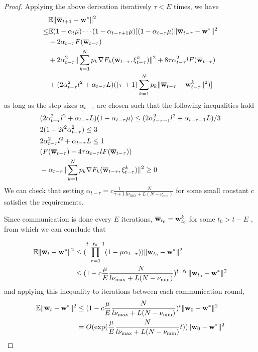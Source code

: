 \begin{proof}
	Applying the above derivation iteratively $\tau<E$ times, we have
	\begin{align*}
	& \mathbb{E}\|{\overline{\mathbf{w}}}_{t+1}-{\mathbf{w}}^{\ast}\|^{2}\\
	\leq &\mathbb{E}(1-\alpha_{t}\mu)\cdots(1-\alpha_{t-\tau+1}\mu)[(1-\alpha_{t-\tau}\mu)\|{\overline{\mathbf{w}}}_{t-\tau}-{\mathbf{w}}^{\ast}\|^{2}\\
	& -2\alpha_{t-\tau}F({\overline{\mathbf{w}}}_{t-\tau})\\
	&+2\alpha_{t-\tau}^{2}\|\sum_{k=1}^{N}p_{k}\nabla F_{k}({\overline{\mathbf{w}}}_{t-\tau},\xi_{t-\tau}^{k})\|^{2}+8\tau\alpha_{t-\tau}^{2}lF({\overline{\mathbf{w}}}_{t-\tau})\\
	& +(2\alpha_{t-\tau}^{2}l^{2}+\alpha_{t-\tau}L)((\tau+1)\sum_{k=1}^{N}p_{k}\|{\overline{\mathbf{w}}}_{t-\tau}-{\mathbf{w}}_{t-\tau}^{k}\|^{2})]
	\end{align*}
	as long as the step sizes $\alpha_{t-\tau}$ are chosen such that
	the following inequalities hold 
	\begin{align*}
	&(2\alpha_{t-\tau}^{2}l^{2}+\alpha_{t-\tau}L)(1-\alpha_{t-\tau}\mu)  \leq(2\alpha_{t-\tau-1}^{2}l^{2}+\alpha_{t-\tau-1}L)/3\\
	&2(1+2l^{2}\alpha_{t-\tau}^{2})  \leq3\\
	&2\alpha_{t-\tau}^{2}l^{2}+\alpha_{t-\tau}L  \leq1\\
	&(F({\overline{\mathbf{w}}}_{t-\tau})-4\tau\alpha_{t-\tau}lF({\overline{\mathbf{w}}}_{t-\tau}))\\
	&-\alpha_{t-\tau}\|\sum_{k=1}^{N}p_{k}\nabla F_{k}({\overline{\mathbf{w}}}_{t-\tau},\xi_{t-\tau}^{k})\|^{2}  \geq0
	\end{align*}
	We can check that setting $\alpha_{t-\tau}=c\frac{1}{\tau+1}\frac{N}{l\nu_{\max}+L(N-\nu_{\min})}$
	for some small constant $c$ satisfies the requirements. 
	
	Since communication is done every $E$ iterations, ${\overline{\mathbf{w}}}_{t_{0}}={\mathbf{w}}_{t_{0}}^{k}$
	for some $t_{0}>t-E$ , from which we can conclude that 
	
	\begin{align*}
	\mathbb{E}\|{\overline{\mathbf{w}}}_{t}-{\mathbf{w}}^{\ast}\|^{2} & \leq(\prod_{\tau=1}^{t-t_{0}-1}(1-\mu\alpha_{t-\tau}))\|{\mathbf{w}}_{t_{0}}-{\mathbf{w}}^{\ast}\|^{2}\\
	& \leq(1-c\frac{\mu}{E}\frac{N}{l\nu_{\max}+L(N-\nu_{\min})})^{t-t_{0}}\|{\mathbf{w}}_{t_{0}}-{\mathbf{w}}^{\ast}\|^{2}
	\end{align*}
	and applying this inequality to iterations between each communication
	round, 
	\begin{align*}
	\mathbb{E}\|{\overline{\mathbf{w}}}_{t}-{\mathbf{w}}^{\ast}\|^{2} & \leq(1-c\frac{\mu}{E}\frac{N}{l\nu_{\max}+L(N-\nu_{\min})})^{t}\|{\mathbf{w}}_{0}-{\mathbf{w}}^{\ast}\|^{2}\\
	& =O(\exp(\frac{\mu}{E}\frac{N}{l\nu_{\max}+L(N-\nu_{\min})}t))\|{\mathbf{w}}_{0}-{\mathbf{w}}^{\ast}\|^{2}
	\end{align*}
	

\end{proof}

